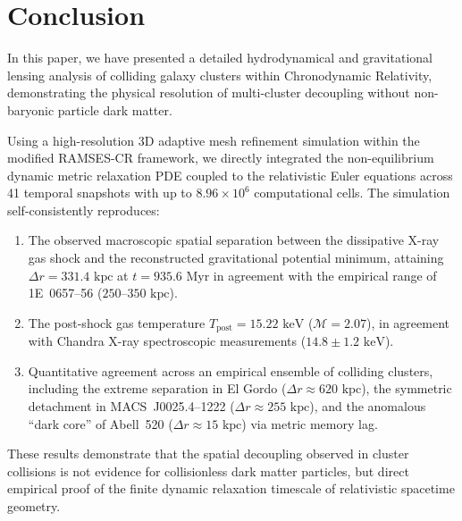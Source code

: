 \documentclass[aps,prd,reprint,superscriptaddress,nofootinbib,floatfix,amsmath,amssymb]{revtex4-2}
\begin{document}
\section{Conclusion}
\label{sec:conclusion}

In this paper, we have presented a detailed hydrodynamical and gravitational lensing analysis of colliding galaxy clusters within Chronodynamic Relativity, demonstrating the physical resolution of multi-cluster decoupling without non-baryonic particle dark matter.

Using a high-resolution 3D adaptive mesh refinement simulation within the modified \textsc{RAMSES-CR} framework, we directly integrated the non-equilibrium dynamic metric relaxation PDE coupled to the relativistic Euler equations across 41 temporal snapshots with up to $8.96 \times 10^6$ computational cells. The simulation self-consistently reproduces:
\begin{enumerate}
    \item The observed macroscopic spatial separation between the dissipative X-ray gas shock and the reconstructed gravitational potential minimum, attaining $\Delta r = 331.4\text{ kpc}$ at $t = 935.6\text{ Myr}$ in agreement with the empirical range of 1E~0657--56 ($250\text{--}350\text{ kpc}$).
    \item The post-shock gas temperature $T_{\text{post}} = 15.22\text{ keV}$ ($\mathcal{M} = 2.07$), in agreement with Chandra X-ray spectroscopic measurements ($14.8 \pm 1.2\text{ keV}$).
    \item Quantitative agreement across an empirical ensemble of colliding clusters, including the extreme separation in El Gordo ($\Delta r \approx 620\text{ kpc}$), the symmetric detachment in MACS~J0025.4--1222 ($\Delta r \approx 255\text{ kpc}$), and the anomalous ``dark core'' of Abell~520 ($\Delta r \approx 15\text{ kpc}$) via metric memory lag.
\end{enumerate}

These results demonstrate that the spatial decoupling observed in cluster collisions is not evidence for collisionless dark matter particles, but direct empirical proof of the finite dynamic relaxation timescale of relativistic spacetime geometry.
\end{document}
